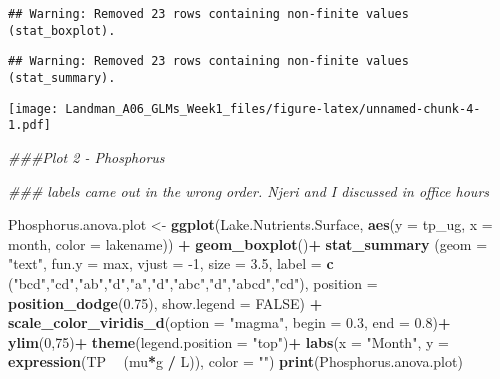 \documentclass[]{article}
\newenvironment{Shaded}{\begin{snugshade}}{\end{snugshade}}
\newcommand{\CommentTok}[1]{\textcolor[rgb]{0.56,0.35,0.01}{\textit{#1}}}
\newcommand{\DataTypeTok}[1]{\textcolor[rgb]{0.13,0.29,0.53}{#1}}
\newcommand{\DecValTok}[1]{\textcolor[rgb]{0.00,0.00,0.81}{#1}}
\newcommand{\FloatTok}[1]{\textcolor[rgb]{0.00,0.00,0.81}{#1}}
\newcommand{\KeywordTok}[1]{\textcolor[rgb]{0.13,0.29,0.53}{\textbf{#1}}}
\newcommand{\NormalTok}[1]{#1}
\newcommand{\OperatorTok}[1]{\textcolor[rgb]{0.81,0.36,0.00}{\textbf{#1}}}
\newcommand{\OtherTok}[1]{\textcolor[rgb]{0.56,0.35,0.01}{#1}}
\newcommand{\StringTok}[1]{\textcolor[rgb]{0.31,0.60,0.02}{#1}}
\begin{document}
\begin{verbatim}
## Warning: Removed 23 rows containing non-finite values (stat_boxplot).
\end{verbatim}

\begin{verbatim}
## Warning: Removed 23 rows containing non-finite values (stat_summary).
\end{verbatim}

\texttt{[image: Landman\_A06\_GLMs\_Week1\_files/figure-latex/unnamed-chunk-4-1.pdf]}

\begin{Shaded}
\begin{Highlighting}[]
\CommentTok{###Plot 2 - Phosphorus}

\CommentTok{### labels came out in the wrong order. Njeri and I discussed in office hours}

\NormalTok{  Phosphorus.anova.plot <-}\StringTok{ }\KeywordTok{ggplot}\NormalTok{(Lake.Nutrients.Surface, }
                              \KeywordTok{aes}\NormalTok{(}\DataTypeTok{y =}\NormalTok{ tp_ug, }\DataTypeTok{x =}\NormalTok{ month, }\DataTypeTok{color =}\NormalTok{ lakename)) }\OperatorTok{+}
\StringTok{  }\KeywordTok{geom_boxplot}\NormalTok{()}\OperatorTok{+}
\StringTok{  }\KeywordTok{stat_summary}\NormalTok{ (}\DataTypeTok{geom =} \StringTok{"text"}\NormalTok{, }\DataTypeTok{fun.y =}\NormalTok{ max, }\DataTypeTok{vjust =} \DecValTok{-1}\NormalTok{, }\DataTypeTok{size =} \FloatTok{3.5}\NormalTok{,}
               \DataTypeTok{label =} \KeywordTok{c}\NormalTok{ (}\StringTok{"bcd"}\NormalTok{,}\StringTok{"cd"}\NormalTok{,}\StringTok{"ab"}\NormalTok{,}\StringTok{"d"}\NormalTok{,}\StringTok{"a"}\NormalTok{,}\StringTok{"d"}\NormalTok{,}\StringTok{"abc"}\NormalTok{,}\StringTok{"d"}\NormalTok{,}\StringTok{"abcd"}\NormalTok{,}\StringTok{"cd"}\NormalTok{), }
               \DataTypeTok{position =} \KeywordTok{position_dodge}\NormalTok{(}\FloatTok{0.75}\NormalTok{),}
               \DataTypeTok{show.legend =} \OtherTok{FALSE}\NormalTok{) }\OperatorTok{+}
\StringTok{    }\KeywordTok{scale_color_viridis_d}\NormalTok{(}\DataTypeTok{option =} \StringTok{"magma"}\NormalTok{, }\DataTypeTok{begin =} \FloatTok{0.3}\NormalTok{, }\DataTypeTok{end =} \FloatTok{0.8}\NormalTok{)}\OperatorTok{+}
\StringTok{  }\KeywordTok{ylim}\NormalTok{(}\DecValTok{0}\NormalTok{,}\DecValTok{75}\NormalTok{)}\OperatorTok{+}
\StringTok{   }\KeywordTok{theme}\NormalTok{(}\DataTypeTok{legend.position =} \StringTok{"top"}\NormalTok{)}\OperatorTok{+}
\StringTok{  }\KeywordTok{labs}\NormalTok{(}\DataTypeTok{x =} \StringTok{"Month"}\NormalTok{, }\DataTypeTok{y =} \KeywordTok{expression}\NormalTok{(TP }\OperatorTok{~}\StringTok{ }\NormalTok{(mu}\OperatorTok{*}\NormalTok{g }\OperatorTok{/}\StringTok{ }\NormalTok{L)), }\DataTypeTok{color =} \StringTok{""}\NormalTok{)}
\KeywordTok{print}\NormalTok{(Phosphorus.anova.plot)}
\end{Highlighting}
\end{Shaded}
\end{document}

